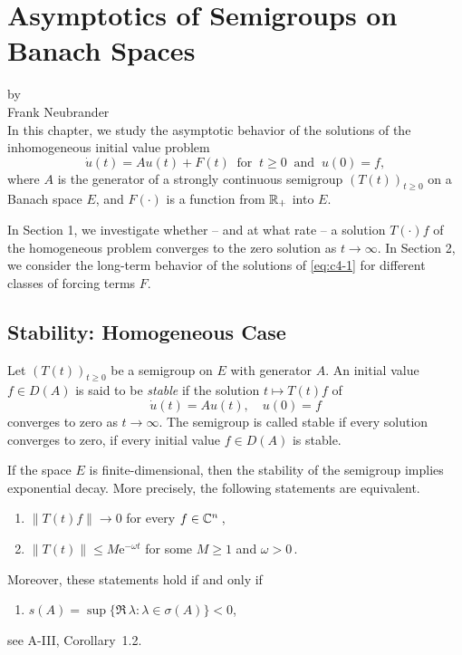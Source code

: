 \chapter{Asymptotics of Semigroups on Banach Spaces}\label{chap:a4}
{\Large
\vspace*{-.75cm}
by \\[.25em]
Frank Neubrander
\vspace{.75cm}
\\
}
In this chapter, we study the asymptotic behavior of the solutions of the inhomogeneous initial value problem
\begin{equation}\label{eq:c4-1}
\dot{u}(t) = Au(t) + F(t) \ \text{ for } \  t \geq 0 \ \text{ and } \  
 u(0) = f, \tag{*}
\end{equation}
where $ A $ is the generator of a strongly continuous semigroup $ (T(t))_{t \geq 0} $ on a Banach space $ E $, and $ F(\cdot) $ is a function from $ \mathbb{R}_{+} $ into $ E $.

In Section 1, we investigate whether -- and at what rate -- a solution $ T(\cdot)f $ of the homogeneous problem converges to the zero solution as $ t \to \infty $. 
In Section 2, we consider the long-term behavior of the solutions of \eqref{eq:c4-1} for different classes of forcing terms $ F $.
\section{Stability: Homogeneous Case}\label{sec:c4-1}
Let $ (T(t))_{t \geq 0} $ be a semigroup on $ E $ with generator $ A $.
An initial value $ f \in D(A) $ is said to be \emph{stable} if the solution $ t \mapsto T(t)f $ of
\begin{equation}\label{eq:c4-2}
\dot{u}(t) = Au(t), \quad u(0) = f \tag{ACP}
\end{equation}
converges to zero as $ t \to \infty $. 
The semigroup is called stable if every solution converges to zero, \ie if every initial value $ f \in D(A) $ is stable.

If the space $ E $ is finite-dimensional, then the stability of the semigroup implies exponential decay. 
More precisely, the following statements are equivalent.
\begin{enumerate}[\upshape (a)]
\item 
$ \|T(t)f\| \to 0 $ for every $ f \in \mathbb{C}^{n} $\,,

\item 
$ \|T(t)\| \leq M \mathrm{e}^{-\omega t} $ for some $M \geq 1$ and  $\omega > 0 $\,.
\end{enumerate}
Moreover, these statements hold if and only if
\begin{enumerate}
\item 
$s(A) = \sup\{\Re\,\lambda \colon \lambda \in \sigma(A)\} < 0$, 
\end{enumerate}
see A-III, Corollary~1.2.

